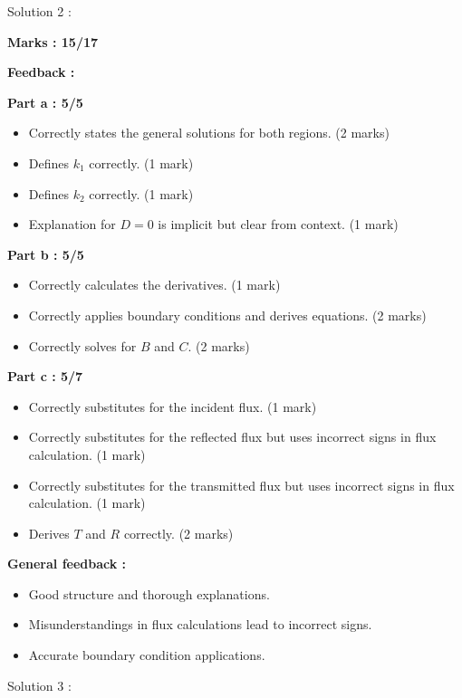 \documentclass[a4paper,11pt]{article}
\begin{document}
Solution 2 :

\textbf{Marks : 15/17}

\textbf{Feedback :}

\textbf{Part a : 5/5}

\begin{itemize}
    \item Correctly states the general solutions for both regions. (2 marks)
    \item Defines $k_1$ correctly. (1 mark)
    \item Defines $k_2$ correctly. (1 mark)
    \item Explanation for $D=0$ is implicit but clear from context. (1 mark)
\end{itemize}

\textbf{Part b : 5/5}

\begin{itemize}
    \item Correctly calculates the derivatives. (1 mark)
    \item Correctly applies boundary conditions and derives equations. (2 marks)
    \item Correctly solves for $B$ and $C$. (2 marks)
\end{itemize}

\textbf{Part c : 5/7}

\begin{itemize}
    \item Correctly substitutes for the incident flux. (1 mark)
    \item Correctly substitutes for the reflected flux but uses incorrect signs in flux calculation. (1 mark)
    \item Correctly substitutes for the transmitted flux but uses incorrect signs in flux calculation. (1 mark)
    \item Derives $T$ and $R$ correctly. (2 marks)
\end{itemize}

\textbf{General feedback :}

\begin{itemize}
    \item Good structure and thorough explanations.
    \item Misunderstandings in flux calculations lead to incorrect signs.
    \item Accurate boundary condition applications.
\end{itemize}


Solution 3 :
\end{document}
